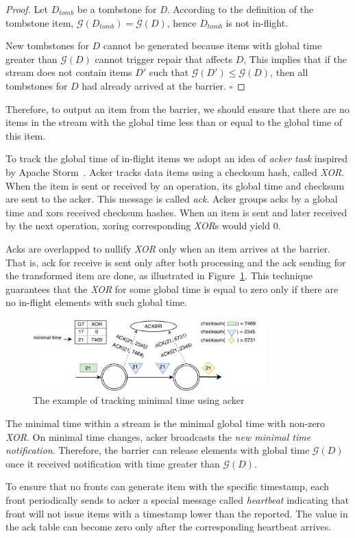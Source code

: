 \begin{proof}
  Let $D_{tomb}$ be a tombstone for {\it D}. 
  According to the definition of the tombstone item, $\mathcal{G} (D_{tomb}) = \mathcal{G} (D)$, hence $D_{tomb}$ is not in-flight.
  
  New tombstones for $D$ cannot be generated because items with global time greater than $\mathcal{G} (D)$ cannot trigger repair that affects $D$,
  This implies that if the stream does not contain items $D\prime$ such that $\mathcal{G} (D\prime) \le \mathcal{G} (D)$, then all tombstones for $D$ had already arrived at the barrier. $\square$
\end{proof}

Therefore, to output an item from the barrier, we should ensure that there are no items in the stream with the global time less than or equal to the global time of this item.

To track the global time of in-flight items we adopt an idea of {\it acker task} inspired by Apache Storm~\cite{apache:storm}. Acker tracks data items using a checksum hash, called {\it XOR}. When the item is sent or received by an operation, its global time and checksum are sent to the acker. This message is called {\it ack}.
 Acker groups acks by a global time and xors received checksum hashes. 
When an item is sent and later received by the next operation, xoring corresponding {\it XOR}s would yield 0.

Acks are overlapped to nullify {\it XOR} only when an item arrives at the barrier. That is, ack for receive is sent only after both processing and the ack sending for the transformed item are done, as illustrated in Figure~\ref{acker}. This technique guarantees that the {\it XOR} for some global time is equal to zero only if there are no in-flight elements with such global time.

\begin{figure}[ht]
  \centering
  \includegraphics[width=0.8\textwidth]{pics/acker}
  \caption{The example of tracking minimal time using acker}
  \label {acker}
\end{figure}

The minimal time within a stream is the minimal global time with non-zero {\it XOR}. On minimal time changes, acker broadcasts the {\it new minimal time notification}. 
Therefore, the barrier can release elements with global time $\mathcal{G} (D)$ 
once it received notification with time greater than $\mathcal{G} (D)$.

To ensure that no fronts can generate item with the specific timestamp, each front periodically sends to acker a special message called {\it heartbeat} indicating that front will not issue items with a timestamp lower than the reported. The value in the ack table can become zero only after the corresponding heartbeat arrives.
